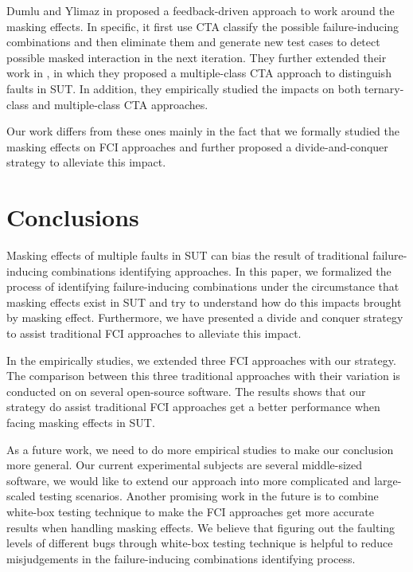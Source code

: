 \documentclass{sig-alternate}
\begin{document}
Dumlu and Ylimaz in \cite{dumlu2011feedback} proposed a feedback-driven approach to work around the masking effects. In specific, it first use CTA classify the possible failure-inducing combinations and then eliminate them and generate new test cases to detect possible masked interaction in the next iteration. They further extended their work in \cite{yilmaz2013reducing}, in which they proposed a multiple-class CTA approach to distinguish faults in SUT. In addition, they empirically studied the impacts on both ternary-class and multiple-class CTA approaches.

Our work differs from these ones mainly in the fact that we formally studied the masking effects on FCI approaches and further proposed a divide-and-conquer strategy to alleviate this impact.

\section{Conclusions}
Masking effects of multiple faults in SUT can bias the result of traditional failure-inducing combinations identifying approaches. In this paper, we formalized the process of identifying failure-inducing combinations under the circumstance that masking effects exist in SUT and try to understand how do this impacts brought by masking effect. Furthermore, we have presented a divide and conquer strategy to assist traditional FCI approaches to alleviate this impact.


In the empirically studies, we extended three FCI approaches with our strategy. The comparison between this three traditional approaches with their variation is conducted on on several open-source software. The results shows that our strategy do assist traditional FCI approaches get a better performance when facing masking effects in SUT.

As a future work, we need to do more empirical studies to make our conclusion more general. Our current experimental subjects are several middle-sized software, we would like to extend our approach into more complicated and large-scaled testing scenarios. Another promising work in the future is to combine white-box testing technique to make the FCI approaches get more accurate results when handling masking effects. We believe that figuring out the faulting levels of different bugs through white-box testing technique is helpful to reduce misjudgements in the failure-inducing combinations identifying process.
\end{document}
